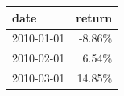 \begin{tabular}{lr}
\toprule
      date &     return \\
\midrule
2010-01-01 &  -8.86\% \\
2010-02-01 &   6.54\% \\
2010-03-01 &  14.85\% \\
\bottomrule
\end{tabular}
